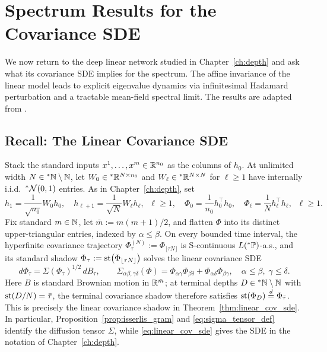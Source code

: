 \section{Spectrum Results for the Covariance SDE}
\label{sec:spectrum-results}

We now return to the deep linear network studied in Chapter~\ref{ch:depth}
and ask what its covariance SDE implies for the spectrum. The affine invariance of the linear model leads to explicit eigenvalue dynamics via infinitesimal Hadamard perturbation and a tractable mean-field spectral limit. The results are adapted from \cite{li2026geometric}.

\subsection{Recall: The Linear Covariance SDE}
\label{subsec:recall-linear-sde}

Stack the standard inputs $x^1, \dots, x^m \in \mathbb{R}^{n_0}$ as the columns of $h_0$. At unlimited width $N \in {}^*\mathbb{N} \setminus \mathbb{N}$, let $W_0 \in {}^*\mathbb{R}^{N \times n_0}$ and $W_\ell \in {}^*\mathbb{R}^{N \times N}$ for $\ell \ge 1$ have internally i.i.d.\ ${}^*\mathcal{N}(0, 1)$ entries. As in Chapter~\ref{ch:depth}, set
\begin{equation}
\label{eq:ch6-linear-rec}
h_1 = \frac{1}{\sqrt{n_0}} W_0 h_0, \quad
h_{\ell+1} = \frac{1}{\sqrt{N}} W_\ell h_\ell, \;\; \ell \ge 1, \quad
\Phi_0 = \frac{1}{n_0} h_0^\top h_0, \quad
\Phi_\ell = \frac{1}{N} h_\ell^\top h_\ell, \;\; \ell \ge 1.
\end{equation}
Fix standard $m \in \mathbb{N}$, let $\bar{m} := m(m+1)/2$, and flatten $\Phi$ into its distinct upper-triangular entries, indexed by $\alpha \le \beta$. On every bounded time interval, the hyperfinite covariance trajectory $\Phi_\tau^{(N)} := \Phi_{\lfloor \tau N \rfloor}$ is S-continuous $L({}^*\mathbb{P})$-a.s., and its standard shadow $\Phi_\tau := \operatorname{st}\bigl(\Phi_{\lfloor \tau N \rfloor}\bigr)$ solves the linear covariance SDE
\begin{equation}
\label{eq:ch6-linear-cov-sde}
d\Phi_\tau = \Sigma(\Phi_\tau)^{1/2}\,dB_\tau, \qquad
\Sigma_{\alpha\beta,\gamma\delta}(\Phi) = \Phi_{\alpha\gamma}\Phi_{\beta\delta} + \Phi_{\alpha\delta}\Phi_{\beta\gamma}, \quad \alpha \le \beta,\; \gamma \le \delta.
\end{equation}
Here $B$ is standard Brownian motion in $\mathbb{R}^{\bar{m}}$; at terminal depths $D \in {}^*\mathbb{N} \setminus \mathbb{N}$ with $\operatorname{st}(D/N) = \bar{\tau}$, the terminal covariance shadow therefore satisfies $\operatorname{st}(\Phi_D) \stackrel{d}{=} \Phi_{\bar{\tau}}$. This is precisely the linear covariance shadow in Theorem~\ref{thm:linear_cov_sde}.
In particular, Proposition~\ref{prop:isserlis_gram} and \eqref{eq:sigma_tensor_def}
identify the diffusion tensor $\Sigma$, while \eqref{eq:linear_cov_sde}
gives the SDE in the notation of Chapter~\ref{ch:depth}.

